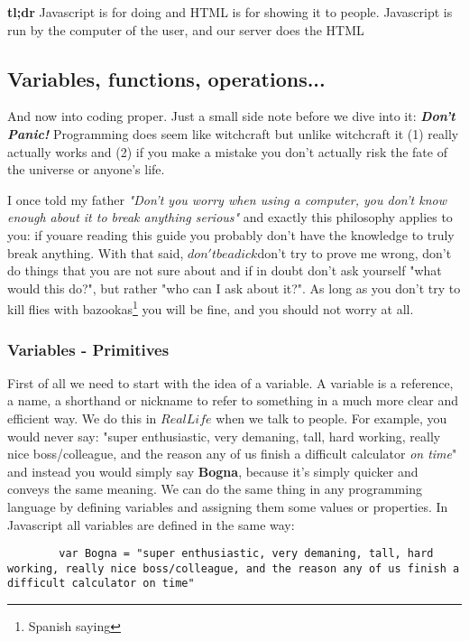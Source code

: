 \large{\textbf{tl;dr}}
Javascript is for doing and HTML is for showing it to people.
Javascript is run by the computer of the user, and our server does the HTML

\subsection{Variables, functions, operations...}
\label{sub:types}

And now into coding proper. Just a small side note before we dive into it: \textit{\textbf{Don't Panic!}} Programming does seem like witchcraft but unlike witchcraft it (1) really actually works and (2) if you make a mistake you don't actually risk the fate of the universe or anyone's life.

I once told my father \textit{"Don't you worry when using a computer, you don't know enough about it to break anything serious"} and exactly this philosophy applies to you: if youare reading this guide you probably don't have the knowledge to truly break anything. With that said, $don't be a dick$\texttrademark don't try to prove me wrong, don't do things that you are not sure about and if in doubt don't ask yourself "what would this do?", but rather "who can I ask about it?".  As long as you don't try to kill flies with bazookas\footnote{Spanish saying} you will be fine, and you should not worry at all.

\subsubsection{Variables - Primitives}
\label{subsub:primitives}
First of all we need to start with the idea of a variable. A variable is a reference, a name, a shorthand or nickname to refer to something in a much more clear and efficient way.  We do this in $Real Life$\texttrademark\xspace  when we talk to people. For example, you would never say: "super enthusiastic, very demaning, tall, hard working, really nice boss/colleague, and the reason any of us finish a difficult calculator \textit{on time}" and instead you would simply say \textbf{Bogna}, because it's simply quicker and conveys the same meaning.
We can do the same thing in any programming language by defining variables and assigning them some values or properties. In Javascript all variables are defined in the same way:
\begin{lstlisting}
        var Bogna = "super enthusiastic, very demaning, tall, hard working, really nice boss/colleague, and the reason any of us finish a difficult calculator on time"
\end{lstlisting}

